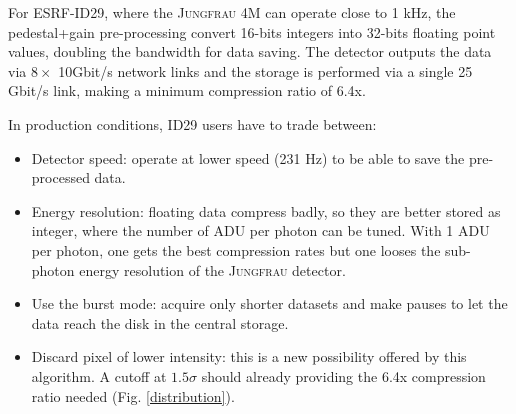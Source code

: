 \documentclass[preprint]{iucr}              %
\begin{document}
For ESRF-ID29, where the \textsc{Jungfrau} 4M can operate close to 1 kHz, the pedestal+gain pre-processing convert 16-bits integers into 32-bits floating point values, doubling the bandwidth for data saving.
The detector outputs the data via $8\times$ 10Gbit/s network links and the storage is performed via a single 25 Gbit/s link, making a minimum compression ratio of 6.4x.

In production conditions, ID29 users have to trade between:
\begin{itemize}
    \item Detector speed: operate at lower speed (231 Hz) to be able to save the pre-processed data.
    \item Energy resolution: floating data compress badly, so they are better stored as integer, where the number of ADU per photon can be tuned. With 1 ADU per photon, one gets the best compression rates but one looses the sub-photon energy resolution of the \textsc{Jungfrau} detector.
    \item  Use the burst mode: acquire only shorter datasets and make pauses to let the data reach the disk in the central storage.
    \item Discard pixel of lower intensity: this is a new possibility offered by this algorithm. 
    A cutoff at $1.5\sigma$ should already providing the 6.4x compression ratio needed (Fig. \ref{distribution}).
\end{itemize}
\end{document}
